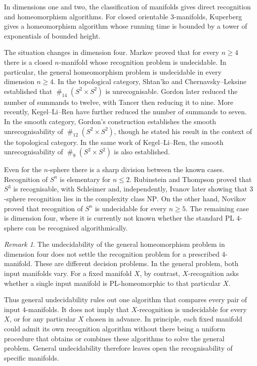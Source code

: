\documentclass[a4paper,11pt,reqno]{amsart}
\theoremstyle{definition}
\theoremstyle{remark}
\newtheorem{remark}{Remark}
\newcommand{\cs}{\mathbin{\#}}
\begin{document}
	In dimensions one and two, the classification of manifolds gives direct
	recognition and homeomorphism algorithms. For closed orientable 3-manifolds, Kuperberg \cite{Kuperberg} gives a homeomorphism algorithm whose running time is bounded by a tower of exponentials of bounded height.
	
	The situation changes in dimension four. Markov \cite{Markov1960} proved that for every
	$n\geq 4$ there is a closed $n$-manifold whose recognition problem is
	undecidable. In particular, the general homeomorphism problem
	is undecidable in every dimension $n\geq 4$. In the topological category, Shtan'ko \cite{Shtanko} and
	Chernavsky--Leksine \cite{ChernavskyLeksine} established that $\cs_{14}(S^2\times S^2)$ is unrecognisable. 
	Gordon \cite{Gordon} later reduced the number of summands to twelve, with Tancer \cite{Tancer} then reducing it to nine. More recently, Kegel--Li--Ren \cite{KegelLiRen2026} have further reduced the number of summands to seven. In the smooth category, Gordon's construction establishes the smooth unrecognisability of $\cs_{12}(S^2\times S^2)$, though he stated his result in the context of the topological category. In the same work of Kegel--Li--Ren, the smooth unrecognisability of $\cs_9(S^2\times S^2)$ is also established. 
	
	Even for the $n$-sphere there is a sharp division between the known cases. Recognition of $S^n$ is elementary for $n\leq 2$. Rubinstein \cite{Rubinstein} and Thompson \cite{Thompson} proved that $S^3$ is recognisable, with Schleimer \cite{Schleimer-s3np} and, independently, Ivanov \cite{Ivanov-s3np} later showing that $3$-sphere recognition lies in the complexity class $\mathrm{NP}$. 
	On the other hand, Novikov \cite[Section 10]{VKF} proved that recognition of $S^n$ is
	undecidable for every $n\geq 5$. The remaining case is
	dimension four, where it is currently not known whether the standard PL $4$-sphere can be
	recognised algorithmically.
	
	\begin{remark}
		The undecidability of the general homeomorphism problem in dimension four does
		not settle the recognition problem for a prescribed $4$-manifold. These are
		different decision problems. In the general problem, both input manifolds
		vary. For a fixed manifold $X$, by contrast, $X$-recognition asks whether a
		single input manifold is PL-homeomorphic to that particular $X$.
		
		Thus general undecidability rules out one algorithm that compares every pair
		of input $4$-manifolds. It does not imply that $X$-recognition is undecidable
		for every $X$, or for any particular $X$ chosen in advance. In principle,
		each fixed manifold could admit its own recognition algorithm without there
		being a uniform procedure that obtains or combines these algorithms to solve
		the general problem. General undecidability therefore leaves open the
		recognisability of specific manifolds.
	\end{remark}
	
\end{document}
